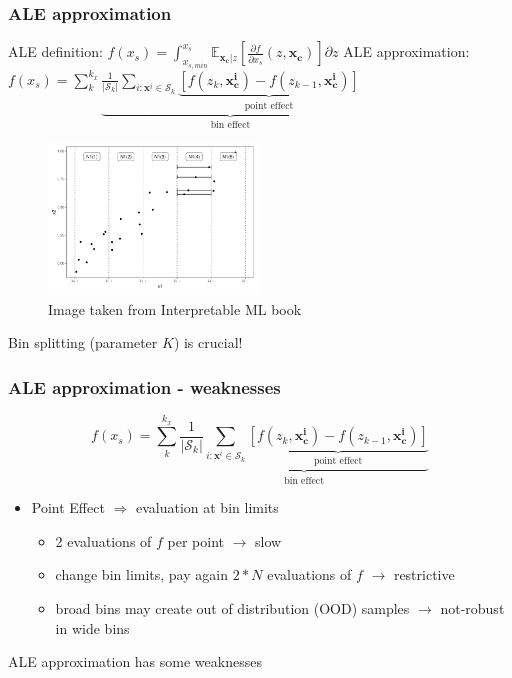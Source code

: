 \documentclass{beamer}
\newcommand{\xb}{\boldsymbol{x}}
\begin{document}
\begin{frame}
  \frametitle{ALE approximation}
  ALE definition: \( f(x_s) = \int_{x_{s, min}}^{x_s}\mathbb{E}_{\bm{x_c}|z}[ \frac{\partial f}{\partial x_s}(z, \bm{x_c})] \partial z \)
  \noindent\makebox[\linewidth]{\rule{\paperwidth}{0.4pt}}
  ALE approximation: \(f(x_s) = \sum_k^{k_x} \underbrace{\frac{1}{|\mathcal{S}_k|} \sum_{i:\xb^i \in \mathcal{S}_k} \underbrace{[f(z_k, \bm{x^i_c}) - f(z_{k-1}, \bm{x^i_c})]}_{\text{point effect}}}_{\text{bin effect}} \)

  \begin{figure}[ht]
    \centering
    \includegraphics[width=0.5\textwidth]{./figures/ale_bins_iml.png}
    \caption{Image taken from Interpretable ML book~\citep{molnar2022}}
  \end{figure}

  \noindent\makebox[\linewidth]{\rule{\paperwidth}{0.4pt}}
  Bin splitting (parameter \(K\)) is crucial!
\end{frame}


\begin{frame}
  \frametitle{ALE approximation - weaknesses}

    \[f(x_s) = \sum_k^{k_x} \underbrace{\frac{1}{|\mathcal{S}_k|} \sum_{i:\xb^i \in \mathcal{S}_k} \underbrace{[f(z_k, \bm{x^i_c}) - f(z_{k-1}, \bm{x^i_c})]}_{\text{point effect}}}_{\text{bin effect}} \]

    \begin{itemize}
      \item Point Effect \(\Rightarrow\) evaluation \alert{at bin limits}
    \begin{itemize}
    \item 2 evaluations of \(f\) per point \( \rightarrow \) slow
    \item change bin limits, pay again \(2*N\) evaluations of \(f\) \( \rightarrow\) restrictive
    \item broad bins may create out of distribution (OOD) samples \( \rightarrow\) not-robust in wide bins
    \end{itemize}
    \end{itemize}

  \noindent\makebox[\linewidth]{\rule{\paperwidth}{0.4pt}}
  ALE approximation has some weaknesses
\end{frame}
\end{document}

